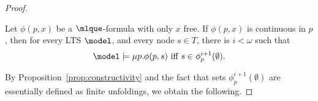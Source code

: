 \begin{proof}
\begin{proposition}\label{prop:constructivity}
Let $\phi(p,x)$ be a $\mlque$-formula with only $x$ free. If $\phi(p,x)$ is continuous in $p$, then for every LTS $\model$, and every node $s \in T$, there is $i < \omega$ such that
\[\model \models \mu p. \phi(p,s) \text{ iff } s \in \phi_p^{i+1}(\emptyset).\]
\end{proposition}

By Proposition~\ref{prop:constructivity} and the fact that sets $\phi_p^{i+1}(\emptyset)$ are essentially defined as finite unfoldings, we obtain the following.%


\end{proof}

